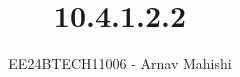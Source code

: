 \documentclass[journal]{IEEEtran}
\begin{document}

\vspace{3cm}

\title{10.4.1.2.2}
\author{EE24BTECH11006 - Arnav Mahishi}
{\let\newpage\relax\maketitle}

\renewcommand{\thefigure}{\theenumi}
\renewcommand{\thetable}{\theenumi}
\setlength{\intextsep}{10pt} %


\renewcommand{\thetable}{\theenumi}
\end{document}

